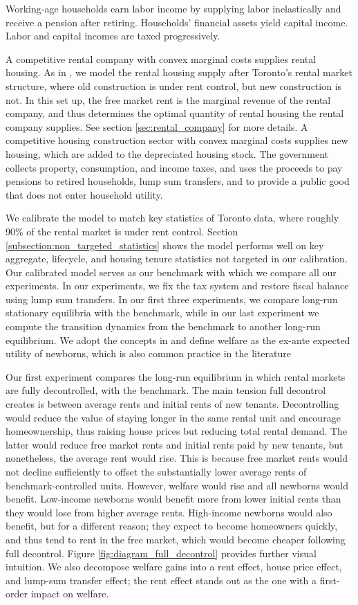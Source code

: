 \documentclass[parskip=full]{article}
\begin{document}
Working-age households earn labor income by supplying labor inelastically and receive a pension after retiring. Households' financial assets yield capital income. Labor and capital incomes are taxed progressively.

A competitive rental company with convex marginal costs supplies rental housing. As in \citet{fallis-1985}, we model the rental housing supply after Toronto's rental market structure, where old construction is under rent control, but new construction is not. In this set up, the free market rent is the marginal revenue of the rental company, and thus determines the optimal quantity of rental housing the rental company supplies. See section \ref{sec:rental_company} for more details. A competitive housing construction sector with convex marginal costs supplies new housing, which are added to the depreciated housing stock. The government collects property, consumption, and income taxes, and uses the proceeds to pay pensions to retired households, lump sum transfers, and to provide a public good that does not enter household utility. 

We calibrate the model to match key statistics of Toronto data, where roughly 90\% of the rental market is under rent control. Section \ref{subsection:non_targeted_statistics} shows the model performs well on key aggregate, lifecycle, and housing tenure statistics not targeted in our calibration. Our calibrated model serves as our benchmark with which we compare all our experiments. In our experiments, we fix the tax system and restore fiscal balance using lump sum transfers. In our first three experiments, we compare long-run stationary equilibria with the benchmark, while in our last experiment we compute the transition dynamics from the benchmark to another long-run equilibrium. We adopt the concepts in \citet{ralws-1971} and define welfare as the ex-ante expected utility of newborns, which is also common practice in the literature \citep{conesa-et-al,gkkoc}

Our first experiment compares the long-run equilibrium in which rental markets are fully decontrolled, with the benchmark. The main tension full decontrol creates is between average rents and initial rents of new tenants. Decontrolling would reduce the value of staying longer in the same rental unit and encourage homeownership, thus raising house prices but reducing total rental demand. The latter would reduce free market rents and initial rents paid by new tenants, but nonetheless, the average rent would rise. This is because free market rents would not decline sufficiently to offset the substantially lower average rents of benchmark-controlled units. However, welfare would rise and all newborns would benefit. Low-income newborns would benefit more from lower initial rents than they would lose from higher average rents. High-income newborns would also benefit, but for a different reason; they expect to become homeowners quickly, and thus tend to rent in the free market, which would become cheaper following full decontrol. Figure \ref{fig:diagram_full_decontrol} provides further visual intuition. We also decompose welfare gains into a rent effect, house price effect, and lump-sum transfer effect; the rent effect stands out as the one with a first-order impact on welfare. 
\end{document}
